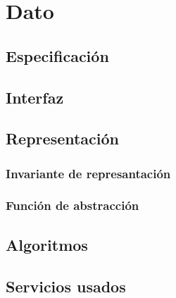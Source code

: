 \section{Dato}

\subsection{Especificación}

\subsection{Interfaz}

\iusa{}

\ioperaciones

\subsection{Representación}

\subsubsection{Invariante de represantación}

\subsubsection{Función de abstracción}

\subsection{Algoritmos}

\subsection{Servicios usados}

